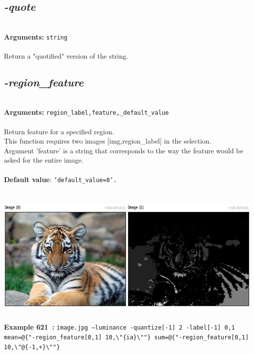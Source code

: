 \documentclass[a4paper,11pt,twoside]{book}
\begin{document}
\subsection{\emph{-quote} }\vspace*{-0.5em}
~\\\textbf{Arguments: } 
{\small \texttt{string}}\\~\\
Return a "quotified" version of the string.


\subsection{\emph{-region\_feature} }\vspace*{-0.5em}
~\\\textbf{Arguments: } 
{\small \texttt{region\_label,feature,\_default\_value}}\\~\\
Return feature for a specified region.
~\\This function requires two images [img,region\_label] in the selection.
~\\Argument 'feature' is a string that corresponds to the way the feature would
be asked for the entire image.
~\\~\\\textbf{Default value}: {\small \texttt{'default\_value=0'.}}
\begin{center}\includegraphics[keepaspectratio=true,height=7cm,width=\textwidth]{img/gmic_def621.jpg}\\
{\footnotesize \textbf{Example 621~:} \texttt{image.jpg --luminance -quantize[-1] 2 -label[-1] 0,1 mean=@\{"-region\_feature[0,1] 10,\textbackslash "\{ia\}\textbackslash ""\} sum=@\{"-region\_feature[0,1] 10,\textbackslash "@\{-1,+\}\textbackslash ""\}}}
\end{center}
\end{document}
